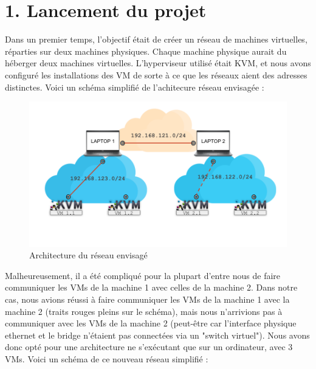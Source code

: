 \documentclass{report}
\begin{document}
\setcounter{section}{0}

\renewcommand{\thesection}{\arabic{section}}


\section*{1. Lancement du projet}

Dans un premier temps, l'objectif était de créer un réseau de machines virtuelles, réparties sur deux machines physiques. Chaque machine
physique aurait du héberger deux machines virtuelles. L'hyperviseur utilisé était KVM, et nous avons configuré les installations des VM
de sorte à ce que les réseaux aient des adresses distinctes. Voici un schéma simplifié de l'achitecure réseau envisagée :

\begin{figure}[H]
    \centering
    \includegraphics[trim=0 120 0 0,width=1\textwidth]{Sources/Corps/architecture_reseau.png}
    \caption[]{Architecture du réseau envisagé}
    \label{fig:architecure_reseau}
\end{figure}

Malheureusement, il a été compliqué pour la plupart d'entre nous de faire communiquer les VMs de la machine 1 avec celles de la machine 2.
Dans notre cas, nous avions réussi à faire communiquer les VMs de la machine 1 avec la machine 2 (traits rouges pleins sur le schéma), mais
nous n'arrivions pas à communiquer avec les VMs de la machine 2 (peut-être car l'interface physique ethernet et le bridge n'étaient pas
connectées via un "switch virtuel").
Nous avons donc opté pour une architecture ne s'exécutant que sur un ordinateur, avec 3 VMs. 
Voici un schéma de ce nouveau réseau simplifié :
\end{document}
